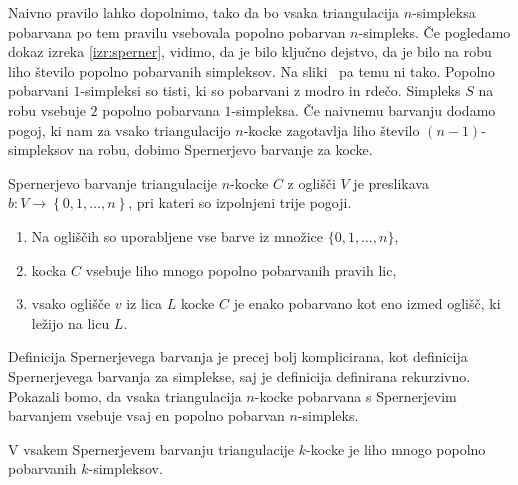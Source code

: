 \documentclass[mat1]{fmfdelo}
\newcommand{\0}{\underline{0}}
\begin{document}
Naivno pravilo lahko dopolnimo, tako da bo vsaka triangulacija $n$-simpleksa pobarvana po tem pravilu vsebovala popolno pobarvan $n$-simpleks. Če pogledamo dokaz izreka \ref{izr:sperner}, vidimo, da je bilo ključno dejstvo, da je bilo na robu liho število popolno pobarvanih simpleksov. Na sliki~\label{fig:ni-pop} pa temu ni tako. Popolno pobarvani $1$-simpleksi so tisti, ki so pobarvani z modro in rdečo. Simpleks $S$ na robu vsebuje $2$ popolno pobarvana $1$-simpleksa. Če naivnemu barvanju dodamo pogoj, ki nam za vsako triangulacijo $n$-kocke zagotavlja liho število $(n-1)$-simpleksov na robu, dobimo Spernerjevo barvanje za kocke.
\begin{definicija}\label{def:cubsperner}
Spernerjevo barvanje triangulacije $n$-kocke $C$ z oglišči $V$ je preslikava $b : V \to \left \{ 0, 1, \dots, n \right \}$, pri kateri so izpolnjeni trije pogoji.
\begin{enumerate}
\item Na ogliščih so uporabljene vse barve iz množice $\{ 0, 1, \dots, n \}$,
\item kocka $C$ vsebuje liho mnogo popolno pobarvanih pravih lic,
\item vsako oglišče $v$ iz lica $L$ kocke $C$ je enako pobarvano kot eno izmed oglišč, ki ležijo na licu $L$.
\end{enumerate}
\end{definicija}
Definicija Spernerjevega barvanja je precej bolj komplicirana, kot definicija Spernerjevega barvanja za simplekse, saj je definicija \label{def:cubsperner} definirana rekurzivno.
Pokazali bomo, da vsaka triangulacija $n$-kocke pobarvana s Spernerjevim barvanjem vsebuje vsaj en popolno pobarvan $n$-simpleks.
\begin{lema}\label{izr:kubsperner}
V vsakem Spernerjevem barvanju triangulacije $k$-kocke je liho mnogo popolno pobarvanih $k$-simpleksov.
\end{lema}
\end{document}
